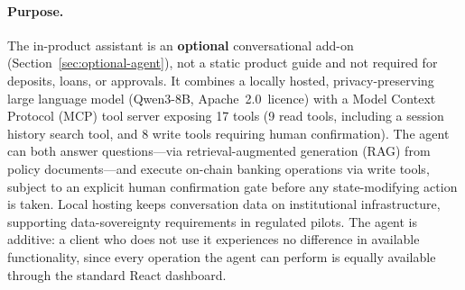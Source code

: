 \documentclass[12pt,a4paper]{report}
\begin{document}
\paragraph{Purpose.}
The in-product assistant is an \textbf{optional} conversational add-on (Section~\ref{sec:optional-agent}), not a static product guide and not required for deposits, loans, or approvals. It combines a locally hosted, privacy-preserving large language model (Qwen3-8B, Apache~2.0~licence) with a Model Context Protocol (MCP) tool server exposing 17 tools (9 read tools, including a session history search tool, and 8 write tools requiring human confirmation). The agent can both answer questions---via retrieval-augmented generation (RAG) from policy documents---and execute on-chain banking operations via write tools, subject to an explicit human confirmation gate before any state-modifying action is taken. Local hosting keeps conversation data on institutional infrastructure, supporting data-sovereignty requirements in regulated pilots. The agent is additive: a client who does not use it experiences no difference in available functionality, since every operation the agent can perform is equally available through the standard React dashboard.
\end{document}
